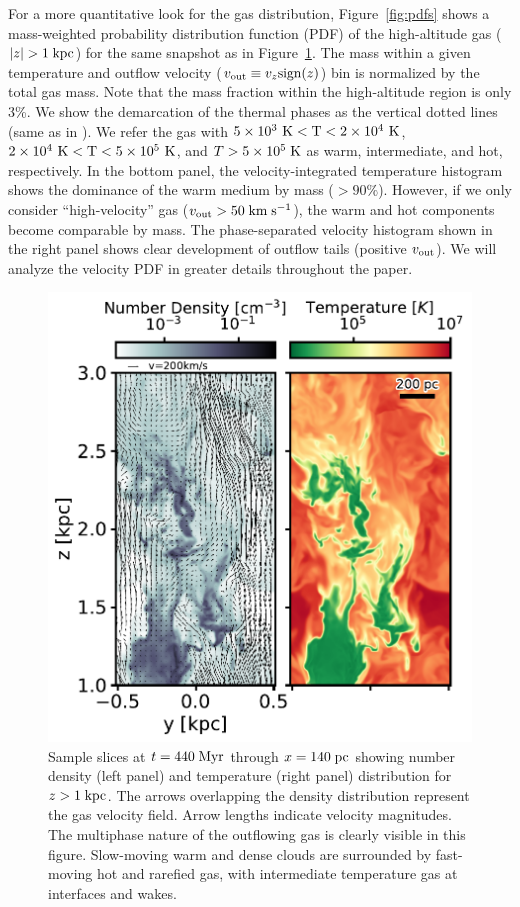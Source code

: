 \documentclass[twocolumn]{aastex62}
\newcommand\kms{\; {\rm km}\;{\rm s}^{-1}}
\newcommand\Myr{\;{\rm Myr}}
\newcommand\pc{\;{\rm pc}}
\newcommand\kpc{\;{\rm kpc}}
\newcommand\Kel{\;{\rm K}}
\begin{document}
For a more quantitative look for the gas distribution, Figure~\ref{fig:pdfs} shows a mass-weighted probability distribution function (PDF) of the high-altitude gas ($|z|>1\kpc$) for the same snapshot as in Figure~\ref{fig:slicenT}. The mass within a given temperature and outflow velocity ($v_{\rm out} \equiv v_z{\rm sign}(z)$) bin is normalized by the total gas mass. Note that the mass fraction within the high-altitude region is only 3\%.
We show the demarcation of the thermal phases as the vertical dotted lines (same as in \citealt{Kim&Ostriker17}). We refer the gas with $5\times10^3~\rm{K}<\rm{T}<2\times10^4~\rm{K}$, $2\times10^4~\rm{K}<\rm{T}<5\times10^5~\rm{K}$, and $T>5\times10^5\Kel$ as warm, intermediate, and hot, respectively. In the bottom panel, the velocity-integrated temperature histogram shows the dominance of the warm medium by mass ($>90\%$). However, if we only consider ``high-velocity'' gas ($v_{\rm out}>50\kms$), the warm and hot components become comparable by mass. The phase-separated velocity histogram shown in the right panel shows clear development of outflow tails (positive $v_{\rm out}$). We will analyze the velocity PDF in greater details throughout the paper. 

\begin{figure} 
	\centering
	\includegraphics[width=\columnwidth]{slices_nH_T.pdf}
	\caption{Sample slices at $t=440\Myr$ through $x=140\pc$ showing number density (left panel) and  temperature (right panel) distribution for $z>1\kpc$. The arrows overlapping the density distribution represent the gas velocity field. Arrow lengths indicate velocity magnitudes. The multiphase nature of the outflowing gas is clearly visible in this figure. Slow-moving warm and dense clouds are surrounded by fast-moving hot and rarefied gas, with intermediate temperature gas at interfaces and wakes.} 
	\label{fig:slicenT}
\end{figure}
\end{document}
